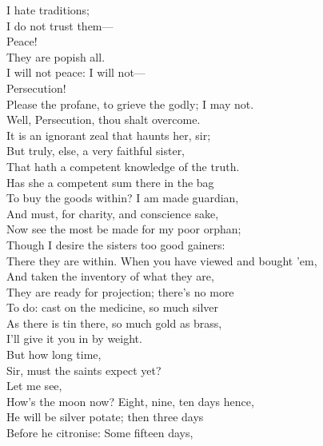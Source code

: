 \documentclass[a4paper,oneside,12pt]{memoir}
\begin{document}
\begin{drama*}
\persecutionspeaks {} I hate traditions;\\
I do not trust them---\\
\tribulationspeaks {} Peace!\\
\persecutionspeaks {} They are popish all.\\
I will not peace: I will not---\\
\tribulationspeaks {} Persecution!\\
\persecutionspeaks Please the profane, to grieve the godly; I may not.\\
\subtlespeaks Well, Persecution, thou shalt overcome.\\
\tribulationspeaks It is an ignorant zeal that haunts her, sir;\\
But truly, else, a very faithful sister,\\
That hath a competent knowledge of the truth.\\
\subtlespeaks Has she a competent sum there in the bag\\
To buy the goods within? I am made guardian,\\
And must, for charity, and conscience sake,\\
Now see the most be made for my poor orphan;\\
Though I desire the sisters too good gainers:\\
There they are within. When you have viewed and bought 'em,\\
And taken the inventory of what they are,\\
They are ready for projection; there's no more\\
To do: cast on the medicine, so much silver\\
As there is tin there, so much gold as brass,\\
I'll give it you in by weight.\\
\tribulationspeaks {} But how long time,\\
Sir, must the saints expect yet?\\
\subtlespeaks {} Let me see,\\
How's the moon now? Eight, nine, ten days hence,\\
He will be silver potate; then three days\\
Before he citronise: Some fifteen days,\\

\end{drama*}
\end{document}
